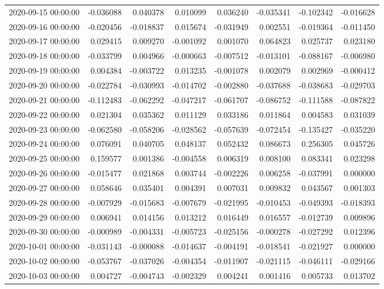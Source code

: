 \begin{tabular}{lrrrrrrr}
2020-09-15 00:00:00 & -0.036088 & 0.040378 & 0.010099 & 0.036240 & -0.035341 & -0.102342 & -0.016628 \\
2020-09-16 00:00:00 & -0.020456 & -0.018837 & 0.015674 & -0.031949 & 0.002551 & -0.019364 & -0.011450 \\
2020-09-17 00:00:00 & 0.029415 & 0.009270 & -0.001092 & 0.001070 & 0.064823 & 0.025737 & 0.023180 \\
2020-09-18 00:00:00 & -0.033799 & 0.004966 & -0.000663 & -0.007512 & -0.013101 & -0.088167 & -0.006980 \\
2020-09-19 00:00:00 & 0.004384 & -0.003722 & 0.013235 & -0.001078 & 0.002079 & 0.002969 & -0.000412 \\
2020-09-20 00:00:00 & -0.022784 & -0.030993 & -0.014702 & -0.002880 & -0.037688 & -0.038683 & -0.029703 \\
2020-09-21 00:00:00 & -0.112483 & -0.062292 & -0.047217 & -0.061707 & -0.086752 & -0.111588 & -0.087822 \\
2020-09-22 00:00:00 & 0.021304 & 0.035362 & 0.011129 & 0.033186 & 0.011864 & 0.004583 & 0.031039 \\
2020-09-23 00:00:00 & -0.062580 & -0.058206 & -0.028562 & -0.057639 & -0.072454 & -0.135427 & -0.035220 \\
2020-09-24 00:00:00 & 0.076091 & 0.040705 & 0.048137 & 0.052432 & 0.086673 & 0.256305 & 0.045726 \\
2020-09-25 00:00:00 & 0.159577 & 0.001386 & -0.004558 & 0.006319 & 0.008100 & 0.083341 & 0.023298 \\
2020-09-26 00:00:00 & -0.015477 & 0.021868 & 0.003744 & -0.002226 & 0.006258 & -0.037991 & 0.000000 \\
2020-09-27 00:00:00 & 0.058646 & 0.035401 & 0.004391 & 0.007031 & 0.009832 & 0.043567 & 0.001303 \\
2020-09-28 00:00:00 & -0.007929 & -0.015683 & -0.007679 & -0.021995 & -0.010453 & -0.049393 & -0.018393 \\
2020-09-29 00:00:00 & 0.006941 & 0.014156 & 0.013212 & 0.016449 & 0.016557 & -0.012739 & 0.009896 \\
2020-09-30 00:00:00 & -0.000989 & -0.004331 & -0.005723 & -0.025156 & -0.000278 & -0.027292 & 0.012396 \\
2020-10-01 00:00:00 & -0.031143 & -0.000088 & -0.014637 & -0.004191 & -0.018541 & -0.021927 & 0.000000 \\
2020-10-02 00:00:00 & -0.053767 & -0.037026 & -0.004354 & -0.011907 & -0.021115 & -0.046111 & -0.029166 \\
2020-10-03 00:00:00 & 0.004727 & -0.004743 & -0.002329 & 0.004241 & 0.001416 & 0.005733 & 0.013702 \\

\end{tabular}
